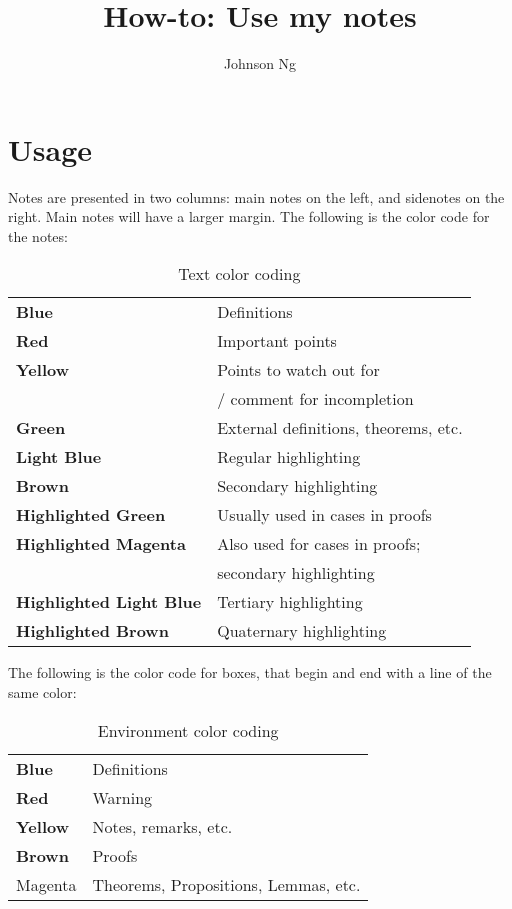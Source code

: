 \documentclass{tufte-handout}
\title{How-to: Use my notes}
\author{Johnson Ng}
\newcommand{\hlimpo}[1]{\textcolor{be-red}{\textbf{#1}}}
\newcommand{\hlwarn}[1]{\textcolor{be-yellow}{\textbf{#1}}}
\newcommand{\hldefn}[1]{\textcolor{be-blue}{\textbf{#1}}}
\newcommand{\hlnotea}[1]{\textcolor{be-green}{\textbf{#1}}}
\newcommand{\hlnoteb}[1]{\textcolor{be-cyan}{\textbf{#1}}}
\newcommand{\hlnotec}[1]{\textcolor{be-brown}{\textbf{#1}}}
\newcommand{\hlb}[2]{\colorbox{#1!30!dark}{\textbf{#2}}}
\newcommand{\hlbnotea}[1]{\hlb{be-green}{#1}}
\newcommand{\hlbnoteb}[1]{\hlb{be-cyan}{#1}}
\newcommand{\hlbnotec}[1]{\hlb{be-brown}{#1}}
\newcommand{\hlbnoted}[1]{\hlb{be-magenta}{#1}}
\begin{document}
\section{Usage}%

Notes are presented in two columns: main notes on the left, and sidenotes on the right.
Main notes will have a larger margin.
The following is the color code for the notes: \\
\begin{table}[ht]
  \caption{Text color coding}
  \begin{tabular}{l l}
    \hldefn{Blue}                     & Definitions \\
    \hlimpo{Red}                      & Important points \\
    \hlwarn{Yellow}                   & Points to watch out for \\
                                      & / comment for incompletion \\
    \hlnotea{Green}                   & External definitions, theorems, etc. \\
    \hlnoteb{Light Blue}              & Regular highlighting \\
    \hlnotec{Brown}                   & Secondary highlighting \\
    \hlbnotea{Highlighted Green}      & Usually used in cases in proofs \\
    \hlbnoted{Highlighted Magenta}    & Also used for cases in proofs; \\
                                      & secondary highlighting \\
    \hlbnoteb{Highlighted Light Blue} & Tertiary highlighting \\
    \hlbnotec{Highlighted Brown}      & Quaternary highlighting
  \end{tabular}
\end{table}

\noindent
The following is the color code for boxes, that begin and end with a line of the same color: \\
\begin{table}[ht]
  \caption{Environment color coding}
  \begin{tabular}{l l}
    \hldefn{Blue}                   & Definitions \\
    \hlimpo{Red}                    & Warning \\
    \hlwarn{Yellow}                 & Notes, remarks, etc. \\
    \hlnotec{Brown}                 & Proofs \\
    \textcolor{be-magenta}{Magenta} & Theorems, Propositions, Lemmas, etc.
  \end{tabular}
\end{table}
\end{document}
